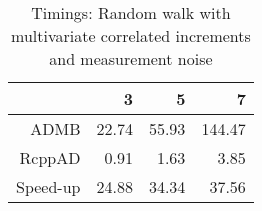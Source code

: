 \begin{table}[ht]
\centering
\begin{tabular}{rrrr}
  \hline
 & 3 & 5 & 7 \\ 
  \hline
ADMB & 22.74 & 55.93 & 144.47 \\ 
  RcppAD & 0.91 & 1.63 & 3.85 \\ 
  Speed-up & 24.88 & 34.34 & 37.56 \\ 
   \hline
\end{tabular}
\caption{Timings: Random walk with multivariate correlated increments and measurement noise} 
\end{table}
